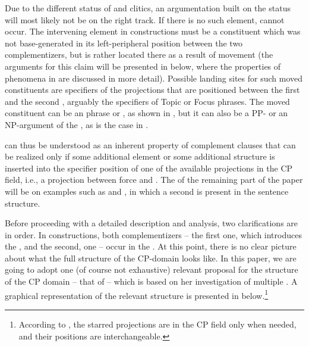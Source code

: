 \documentclass[output=paper,colorlinks,citecolor=brown]{langsci/langscibook}
\begin{document}
{\noindent Due to the different status of  and  clitics, an argumentation built on the  status will most likely not be on the right track.} If there is no such element,  cannot occur. The intervening element in  constructions must be a constituent which was not base-generated in its left-peripheral position between the two complementizers, but is rather located there as a result of movement (the arguments for this claim will be presented in  below, where the properties of  phenomena in  are discussed in more detail). Possible landing sites for such moved constituents are specifiers of the projections that are positioned between the first and the second , arguably the specifiers of Topic or Focus phrases. The moved constituent can be an  phrase or , as shown in , but it can also be a PP- or an NP-argument of the , as is the case in .

 can thus be understood as an inherent property of complement clauses that can be realized only if some additional element or some additional structure is inserted into the specifier position of one of the available projections in the CP field, i.e., a projection between force and . The  of the remaining part of the paper will be on examples such as  and , in which a second  is present in the sentence structure.

Before proceeding with a detailed description and analysis, two clarifications are in order. In  constructions, both complementizers – the first one, which introduces the , and the second,  one – occur in the . At this point, there is no clear picture about what the full structure of the  CP-domain looks like. In this paper, we are going to adopt one (of course not exhaustive) relevant proposal for the structure of the  CP domain – that of \cite{mismas2015} – which is based on her investigation of  multiple . A graphical representation of the relevant structure is presented in  below.\footnote{According to \cite{mismas2015}, the starred projections are in the CP field only when needed, and their positions are interchangeable.}
\end{document}
